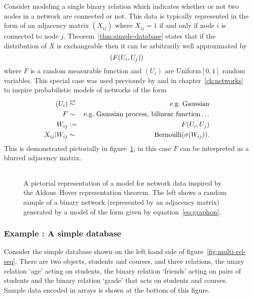 Consider modeling a single binary relation which indicates whether or not two nodes in a network are connected or not.
This data is typically represented in the form of an adjacency matrix $(X_{ij})$ where $X_{ij} = 1$ if and only if node $i$ is connected to node $j$.
Theorem~\ref{thm:simple-database} states that if the distribution of $X$ is exchangeable then it can be arbitrarily well approximated by
\begin{equation}
(F(U_i, U_j))
\end{equation}
where $F$ is a random measurable function and $(U_i)$ are \iid Uniform$[0,1]$ random variables.
This special case was used previously by \cite{Hoff2007a,Roy2009,Lloyd2012} and in chapter~\ref{ch:networks} to inspire probabilistic models of networks of the form
\begin{eqnarray}
(U_i) & \overset{\mbox{\tiny iid}}{\sim} & \textrm{e.g.\ Gaussian} \\
F & \sim & \textrm{e.g.\ Gaussian process, bilinear function}\ldots \\
W_{ij} & := & F(U_i, U_j) \\
X_{ij} | W_{ij} & \sim & \textrm{Bernoulli}(\sigma(W_{ij}))\label{eq:graphon}.
\end{eqnarray}
This is demonstrated pictorially in figure~\ref{fig:graphon}; in this case $F$ can be interpreted as a blurred adjacency matrix.

\begin{figure}[ht]
\centering
\begin{tabular}{c}

\end{tabular}
\caption{
A pictorial representation of a model for network data inspired by the Aldous--Hover representation theorem.
The left shows a random sample of a binary network (represented by an adjacency matrix) generated by a model of the form given by equation~\eqref{eq:graphon}.
}
\label{fig:graphon}
\end{figure}

\subsubsection{Example : A simple database}

Consider the simple database shown on the left hand side of figure~\ref{fig:multi-rel-seq}.
There are two objects, students and courses, and three relations, the unary relation `age' acting on students, the binary relation `friends' acting on pairs of students and the binary relation `grade' that acts on students and courses.
Sample data encoded in arrays is shown at the bottom of this figure.

